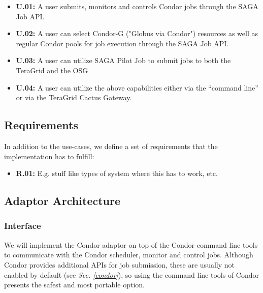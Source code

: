     \begin{itemize} \item \textbf{U.01:} A user submits, monitors and
    controls Condor jobs through the SAGA Job API.

    \item \textbf{U.02:} A user can select Condor-G ("Globus via
    Condor") resources as well as regular Condor pools for job execution
    through the SAGA Job API.

    \item \textbf{U.03:} A user can utilize SAGA Pilot Job to submit
    jobs to both the TeraGrid and the OSG

    \item \textbf{U.04:} A user can utilize the above capabilities
    either via the ``command line'' or via the TeraGrid Cactus Gateway.




\end{itemize}

\subsection{Requirements}

In addition to the use-cases, we define a set of requirements that the 
implementation has to fulfill:

\begin{itemize}
\item \textbf{R.01:} E.g. stuff like types of system where this has to work, etc.
\end{itemize}

\subsection{Adaptor Architecture}

\subsubsection{Interface}

    We will implement the Condor adaptor on top of the Condor command
    line tools to communicate with the Condor scheduler, monitor and
    control jobs. Although Condor provides additional APIs for job
    submission, these are usually not enabled by default (see
    \textit{Sec. \ref{condor}}), so using the command line tools of
    Condor presents the safest and most portable option.


